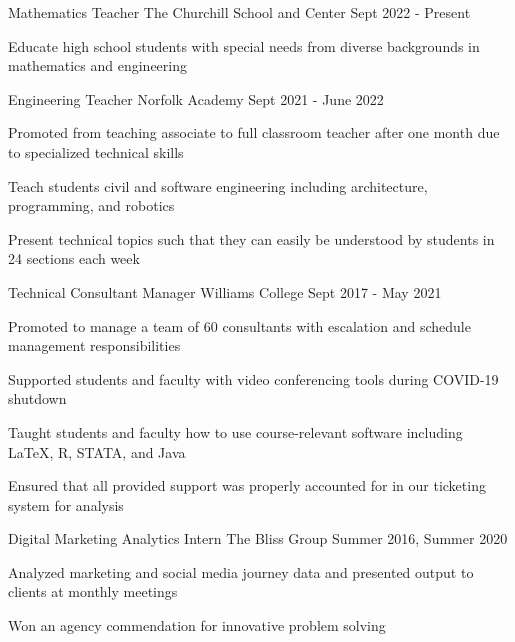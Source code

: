 \begin{cventries}
    \cventry
    {Mathematics Teacher}
    {The Churchill School and Center}
    {}
    {Sept 2022 - Present}
    {
      \begin{cvitems}
        \item {Educate high school students with special needs from diverse backgrounds in mathematics and engineering}
      \end{cvitems}
    }
    \cventry
    {Engineering Teacher}
    {Norfolk Academy}
    {}
    {Sept 2021 - June 2022}
    {
      \begin{cvitems}
        \item {Promoted from teaching associate to full classroom teacher after one month due to specialized technical skills}
        \item {Teach students civil and software engineering including architecture, programming, and robotics}
        \item {Present technical topics such that they can easily be understood by students in 24 sections each week}
      \end{cvitems}
    }
    \cventry
    {Technical Consultant Manager}
    {Williams College}
    {}
    {Sept 2017 - May 2021}
    {
      \begin{cvitems}
        \item {Promoted to manage a team of 60 consultants with escalation and schedule management responsibilities}
        \item{Supported students and faculty with video conferencing tools during COVID-19 shutdown}
        \item {Taught students and faculty how to use course-relevant software including LaTeX, R, STATA, and Java}
        \item {Ensured that all provided support was properly accounted for in our ticketing system for analysis}
      \end{cvitems}
    }
    \cventry
    {Digital Marketing Analytics Intern}
    {The Bliss Group}
    {}
    {Summer 2016, Summer 2020}
    {
      \begin{cvitems}
        \item {Analyzed marketing and social media journey data and presented output to clients at monthly meetings}
        \item {Won an agency commendation for innovative problem solving}

\end{cvitems}}
\end{cventries}
